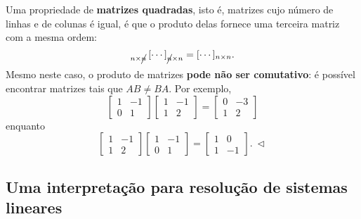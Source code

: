 \begin{ex}
	Uma propriedade de \textbf{matrizes quadradas}, isto é, matrizes cujo número de linhas e de colunas é igual, é que o produto delas fornece uma terceira matriz com a mesma ordem:
	\begin{equation}
	[\cdots]_{n \times \cancel{n}} \, [\cdots]_{\cancel{n} \times n} = [\cdots]_{n \times n}.
	\end{equation} Mesmo neste caso, o produto de matrizes \textbf{pode não ser comutativo}: é possível encontrar matrizes tais que $AB \neq BA$. Por exemplo,
	\begin{equation}
	\left[
	\begin{array}{cc}
	1 & -1  \\
	0 &  1  
	\end{array}
	\right]
	\left[
	\begin{array}{cc}
	1 & -1  \\
	1 &  2  
	\end{array}
	\right] =
	\left[
	\begin{array}{cc}
	0 & -3  \\
	1 &  2  
	\end{array}
	\right]
	\end{equation} enquanto
	\begin{equation}
	\left[
	\begin{array}{cc}
	1 & -1  \\
	1 &  2  
	\end{array}
	\right]
	\left[
	\begin{array}{cc}
	1 & -1  \\
	0 &  1  
	\end{array}
	\right] =
	\left[
	\begin{array}{cc}
	1 & 0  \\
	1 & -1  
	\end{array}
	\right]. \ \lhd
	\end{equation}
\end{ex}





\subsection{Uma interpretação para resolução de sistemas lineares}\label{scn:resolucao-2-sistemas}

